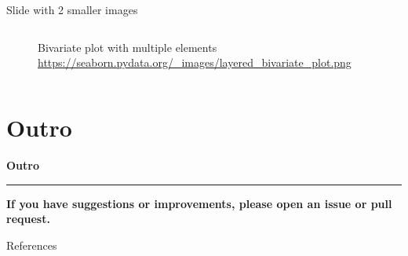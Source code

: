 \documentclass[aspectratio=169, 10pt]{beamer}
\begin{document}
\begin{frame}[fragile]{Slide with 2 smaller images}
\begin{columns}
\begin{column}{0.44\textwidth}
\begin{figure}[!htbp]
                \caption{Bivariate plot with multiple elements\\
                \tiny\url{https://seaborn.pydata.org/_images/layered_bivariate_plot.png}}
            \end{figure}
        \end{column}
    \end{columns}
\end{frame}

{
    \AtBeginSection{}
    \section{Outro}
    \begin{frame}
        \centering
        {\huge \textbf{Outro}}
        \vspace{15pt}
        \hrule
        \vspace{15pt}
        {\normalsize \textbf{If you have suggestions or improvements, please open an issue or pull request.}}
    \end{frame}
}


\renewcommand{\bibsection}{}  %
\begin{frame}{References}

\scriptsize

\end{frame}
\end{document}
